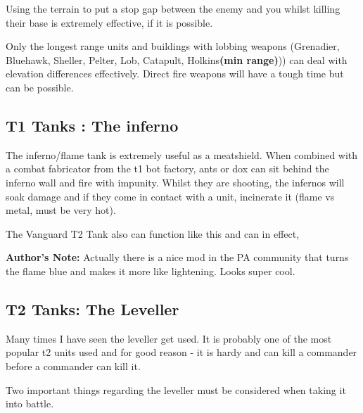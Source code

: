 \documentclass[]{article}
\begin{document}
Using the terrain to put a stop gap between the enemy and you whilst killing their base is extremely effective, if it is possible.  

Only the longest range units and buildings with lobbing weapons (Grenadier, Bluehawk, Sheller, Pelter, Lob, Catapult, Holkins\textbf{(min range)})) can deal with elevation differences effectively.  Direct fire weapons will have a tough time but can be possible. 


\subsection{T1 Tanks : The inferno}

The inferno/flame tank is extremely useful as a meatshield.  When combined with a combat fabricator from the t1 bot factory, ants or dox can sit behind the inferno wall and fire with impunity.  Whilst they are shooting, the infernos will soak damage and if they come in contact with a unit, incinerate it (flame vs metal, must be very hot).

The Vanguard T2 Tank also can function like this and can in effect, 

\textbf{Author's Note: } Actually there is a nice mod in the PA community that turns the flame blue and makes it more like lightening.  Looks super cool.  


\subsection{T2 Tanks: The Leveller}

Many times I have seen the leveller get used.  It is probably one of the most popular t2 units used and for good reason - it is hardy and can kill a commander before a commander can kill it.  

Two important things regarding the leveller must be considered when taking it into battle.
 
\end{document}
